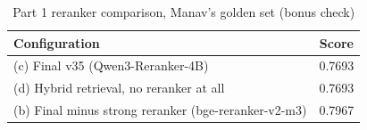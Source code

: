 \begin{table}[t]
\caption{Part 1 reranker comparison, Manav's golden set (bonus check)}
\label{tab:p1-reranker}
\centering\small
\begin{tabular}{lc}
\toprule
Configuration & Score \\
\midrule
(c) Final v35 (Qwen3-Reranker-4B) & 0.7693 \\
(d) Hybrid retrieval, no reranker at all & 0.7693 \\
(b) Final minus strong reranker (bge-reranker-v2-m3) & 0.7967 \\
\bottomrule
\end{tabular}
\end{table}
